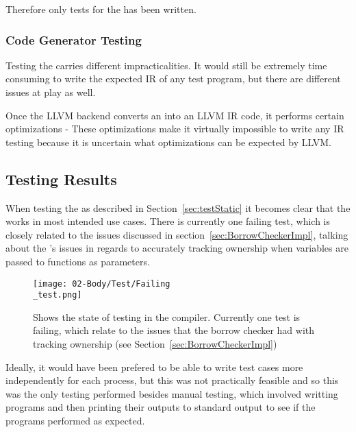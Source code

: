 Therefore only tests for the \borrowChecker{} has been written.

\subsubsection{Code Generator Testing}

Testing the \codeGen{} carries different impracticalities. It would still be
extremely time consuming to write the expected IR of any test program, but there are
different issues at play as well. 

Once the LLVM backend converts an \ast{} into an LLVM IR code, it performs certain
optimizations - These optimizations make it virtually impossible to write any IR
testing because it is uncertain what optimizations can be expected by LLVM.

\subsection{Testing Results}

When testing the \borrowChecker{} as described in Section~\ref{sec:testStatic} it
becomes clear that the \borrowChecker{} works in most intended use cases. There is
currently one failing test, which is closely related to the issues discussed in
section~\ref{sec:BorrowCheckerImpl}, talking about the \borrowChecker's issues in
regards to accurately tracking ownership when variables are passed to functions as
parameters.

\begin{figure}[ht]
  \texttt{[image: 02-Body/Test/Failing\\\_test.png]}
  \caption{Shows the state of testing in the \lang{} compiler. Currently one test is
  failing, which relate to the issues that the borrow checker had with tracking
ownership (see Section~\ref{sec:BorrowCheckerImpl})}
  \label{fig:failTest}
\end{figure}

Ideally, it would have been prefered to be able to write test cases more
independently for each process, but this was not practically feasible and so this was
the only testing performed besides manual testing, which involved writting programs
and then printing their outputs to standard output to see if the programs performed
as expected.

\newpage
